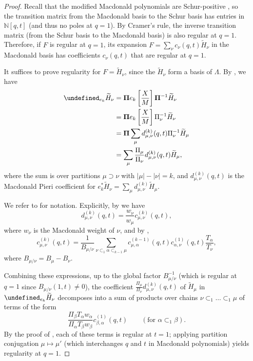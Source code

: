 \documentclass[reqno]{amsart}
\theoremstyle{plain}
\theoremstyle{definition}
\theoremstyle{remark}
\newcommand{\Ht}{\widetilde{H}}
\let\oldTheta\Theta
\let\Theta\undefined
\DeclareMathOperator{\Theta}{\oldTheta}
\newcommand{\<}{\langle}
\renewcommand{\>}{\rangle}
\begin{document}
\begin{proof}
    Recall that the modified Macdonald polynomials are Schur-positive \cite{Haiman2001nFactorial}, so the transition matrix from the Macdonald basis to the Schur basis has entries in $\mathbb{N}[q,t]$ (and thus no poles at $q=1$).
    By Cramer's rule, the inverse transition matrix (from the Schur basis to the Macdonald basis) is also regular at $q=1$. Therefore, if $F$ is regular at $q=1$, its expansion $F = \sum_\nu c_\nu(q,t) \Ht_\nu$ in the Macdonald basis has coefficients $c_\nu(q,t)$ that are regular at $q=1$.

    It suffices to prove regularity for $F = \Ht_\nu$, since the $\Ht_\nu$ form a basis of $\Lambda$. By , we have
    \begin{align*}
        \Theta_{e_k} \Ht_\nu & = \mathbf{\Pi} e_k \left[\frac{X}{M}\right] \mathbf{\Pi}^{-1} \Ht_\nu \\
        & = \mathbf{\Pi} e_k \left[\frac{X}{M}\right] \Pi_{\nu}^{-1} \Ht_\nu \\
        & = \mathbf{\Pi} \sum_{\mu} d^{(k)}_{\mu,\nu}(q,t) \Pi_{\nu}^{-1}  \Ht_\mu \\
        & = \sum_{\mu} \frac{\Pi_{\mu}}{\Pi_{\nu}} d^{(k)}_{\mu,\nu}(q,t) \Ht_\mu,
    \end{align*}
    where the sum is over partitions $\mu \supset \nu$ with $|\mu| - |\nu| = k$, and $d^{(k)}_{\mu,\nu}(q,t)$ is the Macdonald Pieri coefficient for $e_k^\ast \Ht_\nu = \sum_\mu d^{(k)}_{\mu,\nu} \Ht_\mu$.
    
    We refer to \cite{GarsiaHaglundXinZabrocki2016PieriRules} for notation. Explicitly, by \cite[Equation~(3.23)]{GarsiaHaglundXinZabrocki2016PieriRules} we have
    \[ d^{(k)}_{\mu,\nu}(q,t) = \frac{w_\nu}{w_\mu} c^{(k)}_{\mu,\nu}(q,t), \]
    where $w_\nu$ is the Macdonald weight of $\nu$, and by \cite[Theorem~3.2]{GarsiaHaglundXinZabrocki2016PieriRules},
    \[ c^{(k)}_{\mu,\nu}(q,t) = \frac{1}{B_{\mu/\nu}} \sum_{\nu \subset_1 \alpha \subset_{k-1} \mu} c^{(k-1)}_{\mu, \alpha}(q,t) c^{(1)}_{\alpha,\nu}(q,t) \frac{T_\alpha}{T_\nu}, \]
    where $B_{\mu/\nu} = B_\mu - B_\nu$.
    
    Combining these expressions, up to the global factor $B_{\mu/\nu}^{-1}$ (which is regular at $q=1$ since $B_{\mu/\nu}(1,t) \neq 0$), the coefficient $\frac{\Pi_\mu}{\Pi_\nu} d^{(k)}_{\mu,\nu}(q,t)$ of $\Ht_\mu$ in $\Theta_{e_k} \Ht_\nu$ decomposes into a sum of products over chains $\nu \subset_1 \dots \subset_1 \mu$ of terms of the form
    \[ \frac{\Pi_\beta T_\alpha w_\alpha}{\Pi_\alpha T_\beta w_\beta} c^{(1)}_{\beta, \alpha}(q,t) \qquad (\text{for } \alpha \subset_1 \beta). \]
    By the proof of \cite[Lemma~5.3]{DAdderioIraciLeBorgneRomeroVandenWyngaerd2022TieredTrees}, each of these terms is regular at $t=1$; applying partition conjugation $\mu \mapsto \mu'$ (which interchanges $q$ and $t$ in Macdonald polynomials) yields regularity at $q=1$.


\end{proof}
\end{document}
